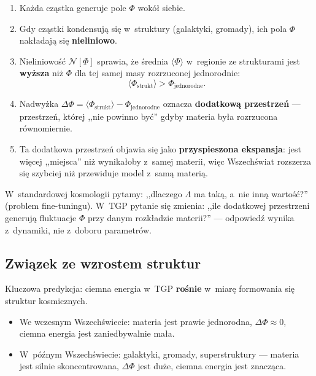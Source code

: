 \begin{enumerate}[nosep]
  \item Ka\.zda cz\k{a}stka generuje pole $\Phi$ wok\'o\l{} siebie.
  \item Gdy cz\k{a}stki kondensuj\k{a} si\k{e} w~struktury (galaktyki,
        gromady), ich pola $\Phi$ nak\l{}adaj\k{a} si\k{e}
        \textbf{nieliniowo}.
  \item Nieliniowo\'s\'c $\mathcal{N}[\Phi]$ sprawia, \.ze
        \'srednia $\langle\Phi\rangle$ w~regionie ze strukturami
        jest \textbf{wy\.zsza} ni\.z $\Phi$ dla tej samej masy
        rozrzuconej jednorodnie:
        \begin{equation}\label{eq:Phi-excess}
            \langle\Phi_{\mathrm{strukt}}\rangle
            > \Phi_{\mathrm{jednorodne}}.
        \end{equation}
  \item Nadwy\.zka $\Delta\Phi = \langle\Phi_{\mathrm{strukt}}\rangle
        - \Phi_{\mathrm{jednorodne}}$ oznacza \textbf{dodatkow\k{a}
        przestrze\'n} --- przestrze\'n, kt\'orej ,,nie powinno by\'c''
        gdyby materia by\l{}a rozrzucona r\'ownomiernie.
  \item Ta dodatkowa przestrze\'n objawia si\k{e} jako
        \textbf{przyspieszona ekspansja}: jest wi\k{e}cej ,,miejsca''
        ni\.z wynika\l{}oby z~samej materii, wi\k{e}c Wszech\'swiat
        rozszerza si\k{e} szybciej ni\.z przewiduje model z~sam\k{a}
        materi\k{a}.
\end{enumerate}

\begin{remark}
W~standardowej kosmologii pytamy: ,,dlaczego $\Lambda$ ma
tak\k{a}, a~nie inn\k{a} warto\'s\'c?'' (problem fine-tuningu).
W~TGP pytanie si\k{e} zmienia: ,,ile dodatkowej przestrzeni
generuj\k{a} fluktuacje $\Phi$ przy danym rozk\l{}adzie materii?''
--- odpowied\'z wynika z~dynamiki, nie z~doboru parametr\'ow.
\end{remark}

\subsection{Zwi\k{a}zek ze wzrostem struktur}\label{ssec:de-struktury}

Kluczowa predykcja: ciemna energia w~TGP \textbf{ro\'snie}
w~miar\k{e} formowania si\k{e} struktur kosmicznych.

\begin{itemize}[nosep]
  \item We wczesnym Wszech\'swiecie: materia jest prawie
        jednorodna, $\Delta\Phi \approx 0$, ciemna energia
        jest zaniedbywalnie ma\l{}a.
  \item W~p\'o\'znym Wszech\'swiecie: galaktyki, gromady,
        superstruktury --- materia jest silnie
        skoncentrowana, $\Delta\Phi$ jest du\.ze, ciemna
        energia jest znacz\k{a}ca.
\end{itemize}

